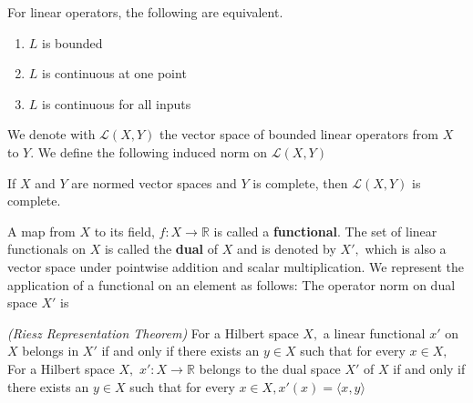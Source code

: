 \begin{theorem}
    For linear operators, the following are equivalent.
    \begin{enumerate}
        \item $L$ is bounded
        \item $L$ is continuous at one point
        \item $L$ is continuous for all inputs
    \end{enumerate}
\end{theorem}
We denote with $\mathcal{L}(X,Y)$ the vector space of  bounded linear operators from $X$ to $Y$. We define the following induced norm on $\mathcal{L}(X,Y)$
\begin{theorem}
    If $X$ and $Y$ are normed vector spaces and $Y$ is complete, then $\mathcal{L}(X,Y)$ is complete.
\end{theorem}
A map from $X$ to its field, $f:X\rightarrow \mathbb{R}$ is called a \textbf{functional}. The set of linear functionals on $X$ is called the \textbf{dual} of $X$ and is denoted by $X',$ which is also a vector space under pointwise addition and scalar multiplication. We represent the application of a functional on an element as follows:
The operator norm on dual space $X'$ is
\begin{theorem}
    \textit{(Riesz Representation Theorem)} For a Hilbert space $X,$ a linear functional $x'$ on $X$ belongs in $X'$ if and only if there exists an $y\in X$ such that for every $x\in X,$
    For a Hilbert space $X,$ $x':X\rightarrow\mathbb{R}$ belongs to the dual space $X'$ of $X$ if and only if there exists an $y\in X$ such that for every $x\in X, x'(x) = \langle x,y\rangle$
\end{theorem}

